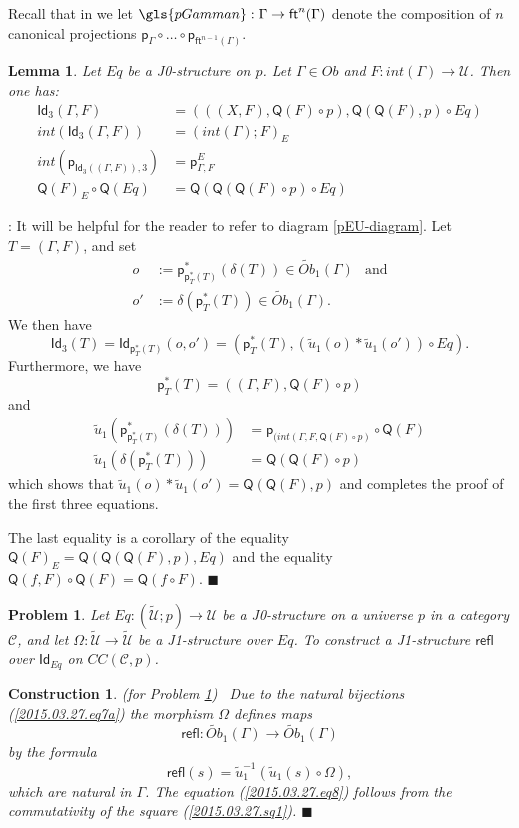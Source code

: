 \documentclass[12pt]{article}
\numberwithin{equation}{section}
\newenvironment{eq}{\begin{equation}}{\end{equation}}
\newenvironment{myproof}{{\bf Proof}:}{$\blacksquare$ \vskip 5mm }
\newtheorem{lemma}[proposition]{Lemma}
\newtheorem{problem}[proposition]{Problem}
\newtheorem{construction0}[proposition]{Construction}
\newenvironment{construction}[1]{\begin{construction0}(for Problem \ref{#1})\ }{$\blacksquare$ \end{construction0}}
\newcommand{\sr}{\rightarrow}
\newcommand{\wt}{\widetilde}
\newcommand{\toCC}{CC} %
\newcommand{\C}{{\mathcal C}}  %
\newcommand{\ft}{\mathsf{ft}}
\newcommand{\p}{\mathsf{p}}
\newcommand{\Id}{\mathsf{Id}} %
\newcommand{\Idx}{\mathsf{Id}_3} %
\newcommand{\refl}{\mathsf{refl}}
\newcommand{\U}{\mathcal{U}}
\newcommand{\Q}{\mathsf{Q}}
\newcommand{\Obwt}{\wt{Ob}}
\begin{document}
%
Recall that in \cite{Csubsystems} we let $\gls{pGamman}:\Gamma\sr \ft^n(\Gamma)$
denote the composition of $n$ canonical projections $\p_{\Gamma}\circ \dots\circ
\p_{\ft^{n-1}(\Gamma)}$.
%
\begin{lemma}
\label{2015.03.27.l1} Let $Eq$ be a J0-structure on $p$. Let $\Gamma\in Ob$
and $F:int(\Gamma)\sr \U$. Then one has:
%
\begin{align}
  \Idx(\Gamma,F) &= (((X,F),\Q(F)\circ p), \Q(\Q(F),p)\circ Eq) \label{2015.03.27.l1-IDx} \\
  int(\Idx(\Gamma,F))&=(int(\Gamma);F)_{E} \label{2015.03.27.l1-eqn2} \\
  int(\p_{\Idx((\Gamma,F)),3}) &= \p^E_{\Gamma,F} \label{2015.03.27.l1-eqn3}  \\
  \Q(F)_{E}\circ \Q(Eq)&=\Q(\Q(\Q(F)\circ p)\circ Eq)
\end{align}
%
%
\end{lemma}
%
\begin{myproof}
It will be helpful for the reader to refer to diagram \ref{pEU-diagram}.
Let $T=(\Gamma,F)$, and set
\begin{align*}
  o &:=\p_{\p_T^*(T)}^*(\delta(T)) \in \Obwt_1(\Gamma) & \text{and}\\
  o'&:=\delta(\p_T^*(T)) \in \Obwt_1(\Gamma) .
\end{align*}
We then have
%
$$\Idx(T)=\Id_{\p_T^*(T)}(o,o')= (\p_T^*(T), (\wt{u}_1(o)*\wt{u}_1(o')) \circ Eq).$$
%
%
%
Furthermore, we have
%
$$\p_T^*(T) =((\Gamma,F),\Q(F)\circ p)$$
%
and
%
\begin{align*}
  \wt{u}_1(\p_{\p_T^*(T)}^*(\delta(T)))&=\p_{(int(\Gamma,F, \Q(F)\circ p)}\circ \Q(F) \\
  \wt{u}_1(\delta(\p_T^*(T)))&=\Q(\Q(F)\circ p)
\end{align*}
%
which shows that $\wt{u}_1(o)*\wt{u}_1(o')=\Q(\Q(F),p)$ and completes the proof
of the first three equations.

The last equality is a corollary of the equality $\Q(F)_{E}=\Q(\Q(\Q(F),p),Eq)$
and the equality $\Q(f,F)\circ \Q(F)=\Q(f\circ F)$.
\end{myproof}
%
\begin{problem}
\label{2015.03.27.prob4} Let $Eq:(\wt{\U};p)\sr \U$
be a J0-structure on a universe $p$ in a category $\C$,
and let $\Omega:\wt{\U}\sr \wt{\U}$ be a J1-structure over $Eq$.
To construct a J1-structure $\refl$ over $\Id_{Eq}$ on $\toCC({\C},p)$.
\end{problem}
%
\begin{construction}{2015.03.27.prob4}\rm
\label{2015.03.27.constr4} Due to the natural bijections
(\ref{2015.03.27.eq7a}) the morphism $\Omega$ defines maps
%
$$\refl:\Obwt_1(\Gamma)\sr \Obwt_1(\Gamma)$$
%
by the formula
%
\begin{eq}
  \label{refl-defn}
  \refl(s)=\wt{u}_1^{-1}(\wt{u}_1(s)\circ \Omega),
\end{eq}%
which are natural in $\Gamma$. The equation (\ref{2015.03.27.eq8}) follows from
the commutativity of the square (\ref{2015.03.27.sq1}).
\end{construction}
\end{document}
